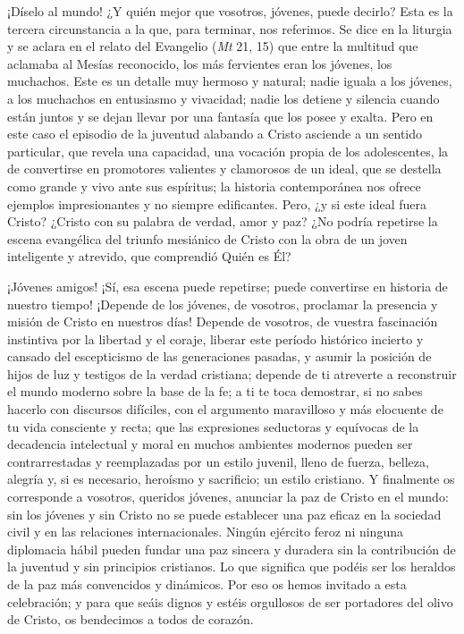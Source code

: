\begin{body}

¡Díselo al mundo! ¿Y quién mejor que vosotros, jóvenes, puede decirlo? Esta es la tercera circunstancia a la que, para terminar, nos referimos. Se dice en la liturgia y se aclara en el relato del Evangelio (\textit{Mt} 21, 15) que entre la multitud que aclamaba al Mesías reconocido, los más fervientes eran los jóvenes, los muchachos. Este es un detalle muy hermoso y natural; nadie iguala a los jóvenes, a los muchachos en entusiasmo y vivacidad; nadie los detiene y silencia cuando están juntos y se dejan llevar por una fantasía que los posee y exalta. Pero en este caso el episodio de la juventud alabando a Cristo asciende a un sentido particular, que revela una capacidad, una vocación propia de los adolescentes, la de convertirse en promotores valientes y clamorosos de un ideal, que se destella como grande y vivo ante sus espíritus; la historia contemporánea nos ofrece ejemplos impresionantes y no siempre edificantes. Pero, ¿y si este ideal fuera Cristo? ¿Cristo con su palabra de verdad, amor y paz? ¿No podría repetirse la escena evangélica del triunfo mesiánico de Cristo con la obra de un joven inteligente y atrevido, que comprendió Quién es Él?

¡Jóvenes amigos! ¡Sí, esa escena puede repetirse; puede convertirse en historia de nuestro tiempo! ¡Depende de los jóvenes, de vosotros, proclamar la presencia y misión de Cristo en nuestros días! Depende de vosotros, de vuestra fascinación instintiva por la libertad y el coraje, liberar este período histórico incierto y cansado del escepticismo de las generaciones pasadas, y asumir la posición de hijos de luz y testigos de la verdad cristiana; depende de ti atreverte a reconstruir el mundo moderno sobre la base de la fe; a ti te toca demostrar, si no sabes hacerlo con discursos difíciles, con el argumento maravilloso y más elocuente de tu vida consciente y recta; que las expresiones seductoras y equívocas de la decadencia intelectual y moral en muchos ambientes modernos pueden ser contrarrestadas y reemplazadas por un estilo juvenil, lleno de fuerza, belleza, alegría y, si es necesario, heroísmo y sacrificio; un estilo cristiano. Y finalmente os corresponde a vosotros, queridos jóvenes, anunciar la paz de Cristo en el mundo: sin los jóvenes y sin Cristo no se puede establecer una paz eficaz en la sociedad civil y en las relaciones internacionales. Ningún ejército feroz ni ninguna diplomacia hábil pueden fundar una paz sincera y duradera sin la contribución de la juventud y sin principios cristianos. Lo que significa que podéis ser los heraldos de la paz más convencidos y dinámicos. Por eso os hemos invitado a esta celebración; y para que seáis dignos y estéis orgullosos de ser portadores del olivo de Cristo, os bendecimos a todos de corazón.
\end{body}


